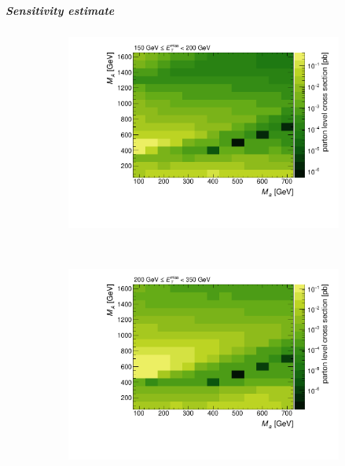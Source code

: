 \subparagraph{Sensitivity estimate}

\begin{figure}[tbp]
\centering
\begin{subfigure}{0.48\textwidth}
\includegraphics[width = \textwidth]{texinputs/04_grid/figures/monoHbb_parton_level_cross_section_bin_1_ma_vs_mA_lin.pdf}
\end{subfigure}
~
\begin{subfigure}{0.48\textwidth}
\includegraphics[width = \textwidth]{texinputs/04_grid/figures/monoHbb_parton_level_cross_section_bin_2_ma_vs_mA_lin.pdf}
\end{subfigure}
\\
\centering
\begin{subfigure}{0.48\textwidth}

\end{subfigure}
\end{figure}
